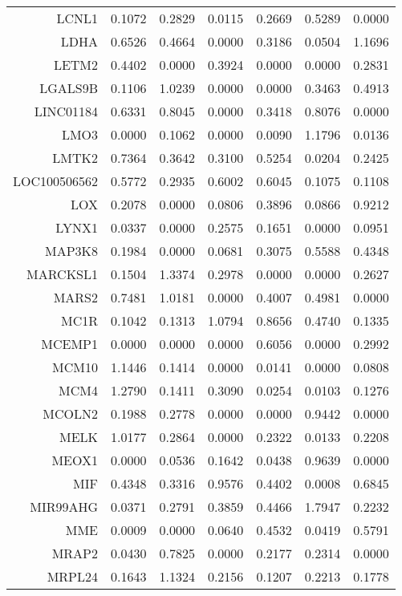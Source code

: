 \begin{longtable}{rrrrrrr}
  LCNL1 & 0.1072 & 0.2829 & 0.0115 & 0.2669 & 0.5289 & 0.0000 \\ 
  LDHA & 0.6526 & 0.4664 & 0.0000 & 0.3186 & 0.0504 & 1.1696 \\ 
  LETM2 & 0.4402 & 0.0000 & 0.3924 & 0.0000 & 0.0000 & 0.2831 \\ 
  LGALS9B & 0.1106 & 1.0239 & 0.0000 & 0.0000 & 0.3463 & 0.4913 \\ 
  LINC01184 & 0.6331 & 0.8045 & 0.0000 & 0.3418 & 0.8076 & 0.0000 \\ 
  LMO3 & 0.0000 & 0.1062 & 0.0000 & 0.0090 & 1.1796 & 0.0136 \\ 
  LMTK2 & 0.7364 & 0.3642 & 0.3100 & 0.5254 & 0.0204 & 0.2425 \\ 
  LOC100506562 & 0.5772 & 0.2935 & 0.6002 & 0.6045 & 0.1075 & 0.1108 \\ 
  LOX & 0.2078 & 0.0000 & 0.0806 & 0.3896 & 0.0866 & 0.9212 \\ 
  LYNX1 & 0.0337 & 0.0000 & 0.2575 & 0.1651 & 0.0000 & 0.0951 \\ 
  MAP3K8 & 0.1984 & 0.0000 & 0.0681 & 0.3075 & 0.5588 & 0.4348 \\ 
  MARCKSL1 & 0.1504 & 1.3374 & 0.2978 & 0.0000 & 0.0000 & 0.2627 \\ 
  MARS2 & 0.7481 & 1.0181 & 0.0000 & 0.4007 & 0.4981 & 0.0000 \\ 
  MC1R & 0.1042 & 0.1313 & 1.0794 & 0.8656 & 0.4740 & 0.1335 \\ 
  MCEMP1 & 0.0000 & 0.0000 & 0.0000 & 0.6056 & 0.0000 & 0.2992 \\ 
  MCM10 & 1.1446 & 0.1414 & 0.0000 & 0.0141 & 0.0000 & 0.0808 \\ 
  MCM4 & 1.2790 & 0.1411 & 0.3090 & 0.0254 & 0.0103 & 0.1276 \\ 
  MCOLN2 & 0.1988 & 0.2778 & 0.0000 & 0.0000 & 0.9442 & 0.0000 \\ 
  MELK & 1.0177 & 0.2864 & 0.0000 & 0.2322 & 0.0133 & 0.2208 \\ 
  MEOX1 & 0.0000 & 0.0536 & 0.1642 & 0.0438 & 0.9639 & 0.0000 \\ 
  MIF & 0.4348 & 0.3316 & 0.9576 & 0.4402 & 0.0008 & 0.6845 \\ 
  MIR99AHG & 0.0371 & 0.2791 & 0.3859 & 0.4466 & 1.7947 & 0.2232 \\ 
  MME & 0.0009 & 0.0000 & 0.0640 & 0.4532 & 0.0419 & 0.5791 \\ 
  MRAP2 & 0.0430 & 0.7825 & 0.0000 & 0.2177 & 0.2314 & 0.0000 \\ 
  MRPL24 & 0.1643 & 1.1324 & 0.2156 & 0.1207 & 0.2213 & 0.1778 \\ 

\end{longtable}
